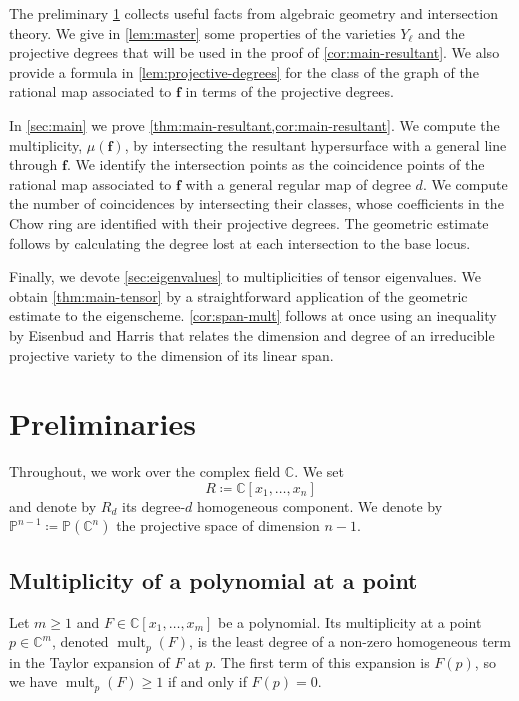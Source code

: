 \documentclass[11pt,letterpaper]{article}
\numberwithin{equation}{section}
\newcommand{\PP}{\mathbb{P}}
\newcommand{\CC}{\mathbb{C}}
\newcommand{\ff}{\ensuremath{\boldsymbol{f}}}
\DeclareMathOperator{\mult}{mult}
\begin{document}
The preliminary \cref{sec:prelim} collects useful facts from algebraic geometry and intersection theory.
We give in \cref{lem:master} some properties of the varieties $Y_\ell$ and the projective degrees that will be used in the proof of \cref{cor:main-resultant}.
We also provide a formula in \cref{lem:projective-degrees} for the class of the graph of the rational map associated to $\ff$ in terms of the projective degrees.

In \cref{sec:main} we prove \cref{thm:main-resultant,cor:main-resultant}.
We compute the multiplicity, $\mu(\ff)$, by intersecting the resultant hypersurface with a general line through $\ff$.
We identify the intersection points as the coincidence points of the rational map associated to $\ff$ with a general regular map of degree $d$.
We compute the number of coincidences by intersecting their classes, whose coefficients in the Chow ring are identified with their projective degrees.
The geometric estimate follows by  calculating the degree lost at each intersection to the base locus.

Finally, we devote \cref{sec:eigenvalues} to multiplicities of tensor eigenvalues. 
We obtain \cref{thm:main-tensor} by a straightforward application of the geometric estimate to the eigenscheme.
\cref{cor:span-mult} follows at once using an inequality by Eisenbud and Harris that relates the dimension and degree of an irreducible projective variety to the dimension of its linear span.

\section{Preliminaries}
\label{sec:prelim}

Throughout, we work over the complex field $\CC$.
We set \[
R\coloneqq \CC[x_1,\ldots,x_n]
\] and denote by $R_d$ its degree-$d$ homogeneous component. 
We denote by $
\PP^{n-1} \coloneqq \PP(\CC^n)
$ the projective space of dimension $n-1$.

\subsection{Multiplicity of a polynomial at a point}

Let $m\geq 1$ and $F\in \CC[x_1,\dots,x_m]$ be a polynomial.
Its multiplicity at a point $p\in\CC^m$, denoted $\mult_p(F)$, is the least degree of a non-zero homogeneous term in the Taylor expansion of $F$ at $p$.
The first term of this expansion is $F(p)$, so we have $\mult_p(F)\geq 1$ if and only if $F(p)=0$.
\end{document}
